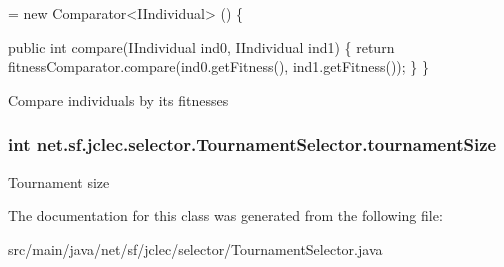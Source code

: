 \begin{DoxyCode}
= 
        \textcolor{keyword}{new} Comparator<IIndividual> () 
        \{

            \textcolor{keyword}{public} \textcolor{keywordtype}{int} compare(IIndividual ind0, IIndividual ind1) 
            \{
                \textcolor{keywordflow}{return} fitnessComparator.compare(ind0.getFitness(), ind1.getFitness());
            \}       
        \}
\end{DoxyCode}
Compare individuals by its fitnesses \hypertarget{classnet_1_1sf_1_1jclec_1_1selector_1_1_tournament_selector_a1f81eb1e5fbfc9b3929ce6a8c41e7d8a}{
\subsubsection[{tournament\-Size}]{\setlength{\rightskip}{0pt plus 5cm}int net.\-sf.\-jclec.\-selector.\-Tournament\-Selector.\-tournament\-Size\hspace{0.3cm}{\ttfamily [protected]}}}\label{classnet_1_1sf_1_1jclec_1_1selector_1_1_tournament_selector_a1f81eb1e5fbfc9b3929ce6a8c41e7d8a}
Tournament size 

The documentation for this class was generated from the following file\-:\begin{DoxyCompactItemize}
\item 
src/main/java/net/sf/jclec/selector/Tournament\-Selector.\-java\end{DoxyCompactItemize}
